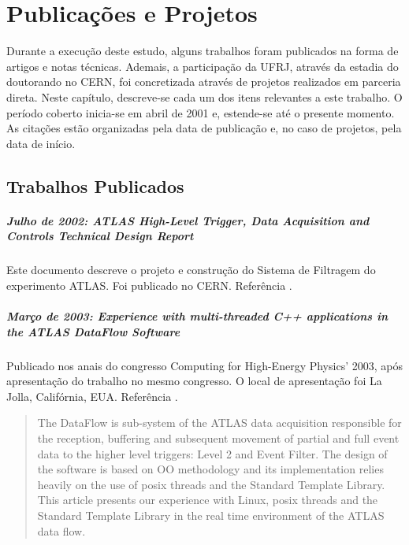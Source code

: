 \typeout{ ====================================================================}
\typeout{ ====================================================================}

\newcommand{\sectioneng}[1]{\foreignlanguage{english}{#1\/}}

\chapter{Publicações e Projetos}
\label{chap:published}

Durante a execução deste estudo, alguns trabalhos foram publicados na forma de
artigos e notas técnicas. Ademais, a participação da UFRJ, através da estadia
do doutorando no CERN, foi concretizada através de projetos realizados em
parceria direta. Neste capítulo, descreve-se cada um dos itens relevantes a
este trabalho. O período coberto inicia-se em abril de 2001 e, estende-se até
o presente momento. As citações estão organizadas pela data de publicação e,
no caso de projetos, pela data de início.

\section{Trabalhos Publicados}

\paragraph{Julho de 2002: \sectioneng{ATLAS High-Level Trigger, Data Acquisition and
Controls Technical Design Report}} Este documento descreve o projeto e
construção do Sistema de Filtragem do experimento ATLAS. Foi publicado no
CERN. Referência \cite{hlt-tdr}.

\paragraph{Março de 2003: \sectioneng{Experience with multi-threaded C++ applications
in the ATLAS DataFlow Software}} Publicado nos anais do congresso
\sectioneng{Computing for High-Energy Physics' 2003}, após apresentação do trabalho
no mesmo congresso. O local de apresentação foi \sectioneng{La Jolla}, Califórnia,
EUA. Referência \cite{aa:chep-2003}.

\begin{quotation}
\sectioneng{The DataFlow is sub-system of the ATLAS data acquisition responsible for the
reception, buffering and subsequent movement of partial and full event data to
the higher level triggers: Level 2 and Event Filter. The design of the
software is based on OO methodology and its implementation relies heavily on
the use of posix threads and the Standard Template Library. This article
presents our experience with Linux, posix threads and the Standard Template
Library in the real time environment of the ATLAS data flow.}
\end{quotation}

